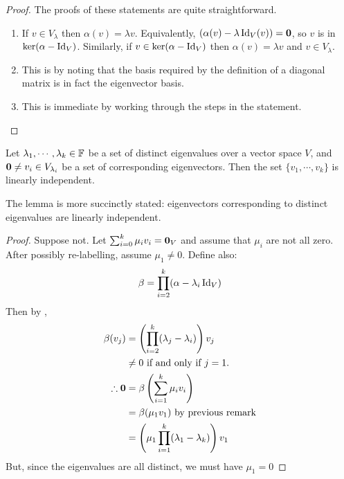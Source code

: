 \documentclass[../Main.tex]{subfiles}
\begin{document}
\begin{proof}
    The proofs of these statements are quite straightforward.
    \begin{enumerate}
        \item If $v \in V_{\lambda}$ then $\alpha(v) = \lambda v$. Equivalently, $(\alpha(v) - \lambda \operatorname{Id}_V(v)) = \boldsymbol{0}$, so $v$ is in $\ker(\alpha - \operatorname{Id}_V)$. Similarly, if $v \in \ker(\alpha - \operatorname{Id}_V)$ then $\alpha(v) = \lambda v$ and $v \in V_{\lambda}$.
        \item This is by noting that the basis required by the definition of a diagonal matrix is in fact the eigenvector basis.
        \item This is immediate by working through the steps in the statement.
    \end{enumerate}
\end{proof}
\begin{lemma}
    Let $\lambda_1, \cdots, \lambda_k \in \mathbb{F}$ be a set of distinct eigenvalues over a vector space $V$, and $\boldsymbol{0} \neq v_i \in V_{\lambda_i}$ be a set of corresponding eigenvectors. Then the set $\{v_1, \cdots, v_k\}$ is linearly independent.
    \label{lemEVecLI}
\end{lemma}
\begin{remark}
    The lemma is more succinctly stated: eigenvectors corresponding to distinct eigenvalues are linearly independent.
\end{remark}
\begin{proof}
    Suppose not. Let $\sum_{i=0}^{k} \mu_i v_i = \boldsymbol{0}_V$ and assume that $\mu_i$ are not all zero. After possibly re-labelling, assume $\mu_1 \neq 0$. Define also:
    \begin{equation*}
        \beta = \prod_{i=2}^{k}(\alpha - \lambda_i \operatorname{Id}_V)
    \end{equation*}
    Then by ,
    \begin{align*}
        \beta(v_j) &= \left(\prod_{i=2}^{k}(\lambda_j - \lambda_i)\right) v_j \\
        &\neq 0 \text{ if and only if } j = 1. \\
        \therefore \boldsymbol{0} &= \beta\left(\sum_{i = 1}^k \mu_i v_i\right) \\
        &= \beta(\mu_1 v_1) \text{ by previous remark} \\
        &= \left(\mu_1 \prod_{i = 1}^k(\lambda_1 - \lambda_k)\right) v_1
    \end{align*}
    But, since the eigenvalues are all distinct, we must have $\mu_1 = 0$ \contradiction
\end{proof}
\end{document}
